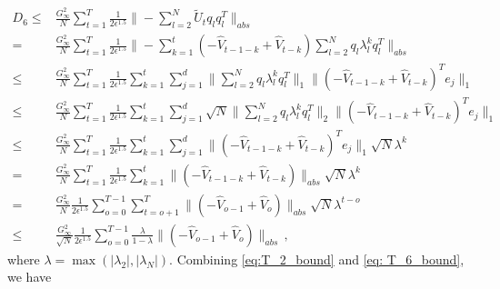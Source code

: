\documentclass[11pt]{article}
\begin{document}
\begin{equation}\label{eq: T_6_bound}
\begin{split}
D_6 \leq & \frac{G_{\infty}^2}{N}\sum_{t=1}^T \frac{1}{2\epsilon^{1.5}}  \| - \sum_{l=2}^N  \tilde U_t q_l q_l^T \|_{abs}  \\
=  & \frac{G_{\infty}^2}{N}\sum_{t=1}^T \frac{1}{2\epsilon^{1.5}}  \| -   \sum_{k=1}^t (- \hat V_{t-1-k} + \hat V_{t-k} )  \sum_{l=2}^N q_l \lambda_l^k q_l^T \|_{abs}  \\ 
\leq &  \frac{G_{\infty}^2}{N}\sum_{t=1}^T \frac{1}{2\epsilon^{1.5}}  \sum_{k=1}^t  \sum_{j=1}^d \| \sum_{l=2}^N q_l \lambda_l^k q_l^T \|_{1}  \|     (- \hat V_{t-1-k} + \hat V_{t-k} )^T e_j \|_1   \\
\leq &  \frac{G_{\infty}^2}{N}\sum_{t=1}^T \frac{1}{2\epsilon^{1.5}}  \sum_{k=1}^t  \sum_{j=1}^d  \sqrt{N}\| \sum_{l=2}^N q_l \lambda_l^k q_l^T \|_{2}  \|     (- \hat V_{t-1-k} + \hat V_{t-k} )^T e_j \|_1   \\
\leq  & \frac{G_{\infty}^2}{N}\sum_{t=1}^T \frac{1}{2\epsilon^{1.5}}  \sum_{k=1}^t \sum_{j=1}^d \|    (- \hat V_{t-1-k} + \hat V_{t-k} )^T e_j\|_1 \sqrt{N} \lambda^k  \\
=  & \frac{G_{\infty}^2}{N}\sum_{t=1}^T \frac{1}{2\epsilon^{1.5}}  \sum_{k=1}^t  \|    (- \hat V_{t-1-k} + \hat V_{t-k} ) \|_{abs} \sqrt{N} \lambda^k  \\
=  & \frac{G_{\infty}^2}{N}\frac{1}{2\epsilon^{1.5}} \sum_{o=0}^{T-1} \sum_{t=o+1}^T     \|    (- \hat V_{o-1} + \hat V_{o} ) \|_{abs} \sqrt{N} \lambda^{t-o}  \\ 
\leq & \frac{G_{\infty}^2}{\sqrt{N}}\frac{1}{2\epsilon^{1.5}} \sum_{o=0}^{T-1} \frac{\lambda}{1-\lambda}     \|    (- \hat V_{o-1} + \hat V_{o} ) \|_{abs} \, ,
\end{split}
\end{equation}
where $\lambda = \max (|\lambda_2|,|\lambda_N|)$.
Combining \eqref{eq:T_2_bound} and \eqref{eq: T_6_bound}, we have
\end{document}
